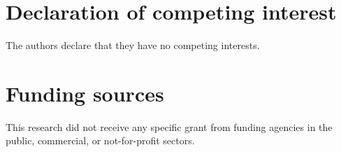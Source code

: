 \documentclass[a4paper,fleqn]{cas-dc}
\begin{document}




\printcredits
\section*{Declaration of competing interest}
The authors declare that they have no competing interests.
\section*{Funding sources}
This research did not receive any specific grant from funding agencies in the public, commercial, or not-for-profit sectors.
\end{document}
